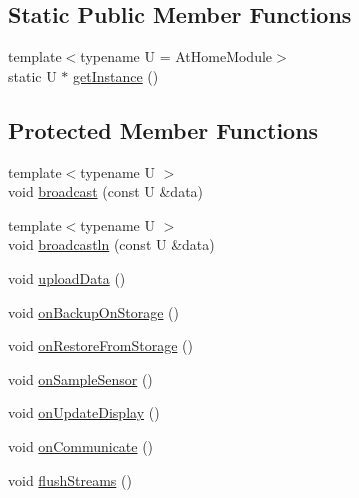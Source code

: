 \subsection*{Static Public Member Functions}
\begin{DoxyCompactItemize}
\item 
{\footnotesize template$<$typename U  = At\+Home\+Module$>$ }\\static U $\ast$ \mbox{\hyperlink{classathome_1_1module_1_1_at_home_module_acc6e7fc0d86f11648fd81729484e546f}{get\+Instance}} ()
\end{DoxyCompactItemize}
\subsection*{Protected Member Functions}
\begin{DoxyCompactItemize}
\item 
{\footnotesize template$<$typename U $>$ }\\void \mbox{\hyperlink{classathome_1_1module_1_1_at_home_module_a22f6afbe9594849ecccae5b9f4dfe47d}{broadcast}} (const U \&data)
\item 
{\footnotesize template$<$typename U $>$ }\\void \mbox{\hyperlink{classathome_1_1module_1_1_at_home_module_a863a9efaa6d10169d1888278cbc70175}{broadcastln}} (const U \&data)
\item 
void \mbox{\hyperlink{classathome_1_1module_1_1_at_home_module_a4fd5a07603ff4cb512d201352aa2be0a}{upload\+Data}} ()
\item 
void \mbox{\hyperlink{classathome_1_1module_1_1_at_home_module_aea6f4c8bdb27fa27915aa63185888f78}{on\+Backup\+On\+Storage}} ()
\item 
void \mbox{\hyperlink{classathome_1_1module_1_1_at_home_module_a7608679045f46ef0c07d7eab430d755b}{on\+Restore\+From\+Storage}} ()
\item 
void \mbox{\hyperlink{classathome_1_1module_1_1_at_home_module_a0c78d6ba7b9784d1a895bd9f109bd048}{on\+Sample\+Sensor}} ()
\item 
void \mbox{\hyperlink{classathome_1_1module_1_1_at_home_module_a78fdbc14589f82531bd08baeb2e3cfb1}{on\+Update\+Display}} ()
\item 
void \mbox{\hyperlink{classathome_1_1module_1_1_at_home_module_ad8da3ff2774cee42f1d45cd12912c937}{on\+Communicate}} ()
\item 
void \mbox{\hyperlink{classathome_1_1module_1_1_at_home_module_ad6e64ed8ff0c2daf0e8bb935b0a8e127}{flush\+Streams}} ()
\end{DoxyCompactItemize}
